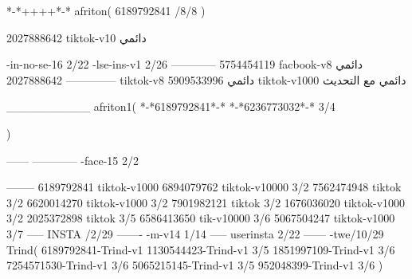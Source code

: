 *-*++++*-*
afriton(
6189792841 /8/8
)

2027888642 tiktok-v10
دائمي

-in-no-se-16 2/22
-lse-ins-v1 2/26
------------
5754454119 facbook-v8
دائمي
--------------
2027888642 tiktok-v8
دائمي
5909533996 tiktok-v1000
دائمي مع التحديث

__________
afriton1(
*-*6189792841*-*
*-*6236773032*-* 3/4

)


------
------------
-face-15 2/2

--------
6189792841 tiktok-v1000
6894079762 tiktok-v10000 3/2
7562474948 tiktok 3/2
6620014270 tiktok-v1000 3/2
7901982121 tiktok 3/2
1676036020 tiktok-v1000 3/2
2025372898 tiktok  3/5
6586413650 tik-v10000 3/6
5067504247 tiktok-v1000 3/7
-----
 INSTA /2/29
-------
-m-v14 1/14
-----
userinsta 2/22
------
-twe/10/29
Trind(
6189792841-Trind-v1 
1130544423-Trind-v1 3/5
1851997109-Trind-v1 3/6
7254571530-Trind-v1 3/6
5065215145-Trind-v1 3/5
952048399-Trind-v1 3/6
)
